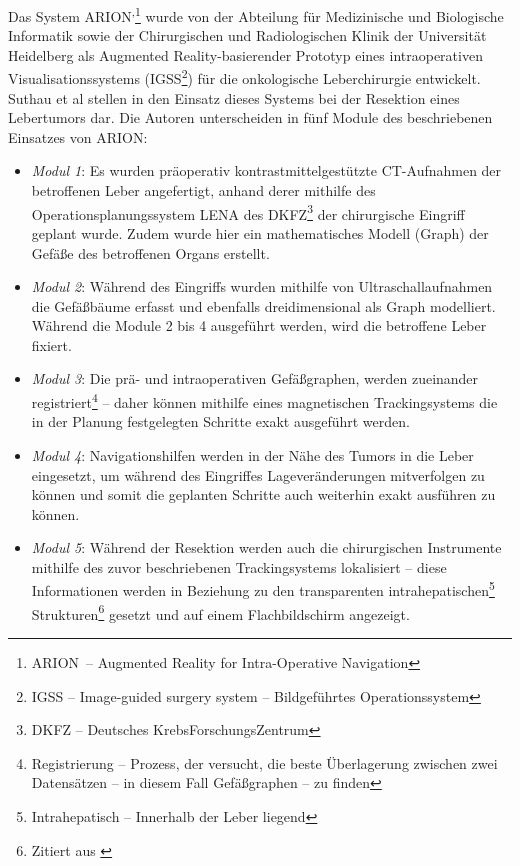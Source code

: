 \documentclass[ngerman,pdftex,paper=A4,DIV=calc,titlepage,12pt]{scrartcl}
\newtheorem[L]{boxedDefinition}{Definition}
\begin{document}
Das System ARION\texttrademark\textsuperscript{,}\footnote{ARION\texttrademark\ -- Augmented Reality for Intra-Operative Navigation} wurde von der Abteilung für Medizinische und Biologische Informatik sowie der Chirurgischen und Radiologischen Klinik der Universität Heidelberg als Augmented Reality-basierender Prototyp eines intraoperativen Visualisationssystems (IGSS\footnote{IGSS -- Image-guided surgery system -- Bildgeführtes Operationssystem}) für die onkologische Leberchirurgie entwickelt. Suthau et al stellen in \cite{Suthau2002DE} den Einsatz dieses Systems bei der Resektion eines Lebertumors dar. Die Autoren unterscheiden in \cite{Suthau2002DE} fünf Module des beschriebenen Einsatzes von ARION\texttrademark:
\begin{itemize}
 \item \textit{Modul 1}: Es wurden präoperativ kontrastmittelgestützte CT-Aufnahmen der betroffenen Leber angefertigt, anhand derer mithilfe des Operationsplanungssystem LENA des DKFZ\footnote{DKFZ -- Deutsches KrebsForschungsZentrum} der chirurgische Eingriff geplant wurde. Zudem wurde hier ein mathematisches Modell (Graph) der Gefäße des betroffenen Organs erstellt.
 \item \textit{Modul 2}: Während des Eingriffs wurden mithilfe von Ultraschallaufnahmen die Gefäßbäume erfasst und ebenfalls dreidimensional als Graph modelliert. Während die Module 2 bis 4 ausgeführt werden, wird die betroffene Leber fixiert.
 \item \textit{Modul 3}: Die prä- und intraoperativen Gefäßgraphen, werden 
zueinander registriert\footnote{Registrierung -- Prozess, der versucht, die beste Überlagerung zwischen zwei Datensätzen -- in diesem Fall Gefäßgraphen -- zu finden} -- daher können mithilfe eines magnetischen Trackingsystems die in der Planung festgelegten Schritte exakt ausgeführt werden.
 \item \textit{Modul 4}: Navigationshilfen werden in der Nähe des Tumors in die Leber eingesetzt, um während des Eingriffes Lageveränderungen mitverfolgen zu können und somit die geplanten Schritte auch weiterhin exakt ausführen zu können.
 \item \textit{Modul 5}: Während der Resektion werden auch die chirurgischen Instrumente mithilfe des zuvor beschriebenen Trackingsystems lokalisiert -- diese Informationen werden \glqq in Beziehung zu den transparenten intrahepatischen\footnote{Intrahepatisch -- Innerhalb der Leber liegend} Strukturen\grqq\footnote{Zitiert aus \cite[Kapitel 2, Seite 3]{Suthau2002DE}} gesetzt und auf einem Flachbildschirm angezeigt.
\end{itemize}
\end{document}
